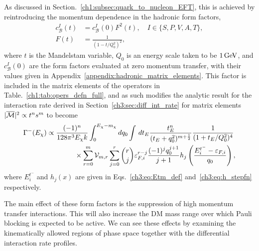 As discussed in Section.~\ref{ch1:subsec:quark_to_nucleon_EFT}, this is achieved by reintroducing the momentum dependence in the hadronic form factors, 
\begin{align}
   c_\mathcal{B}^I(t)  &= c_\mathcal{B}^{I}(0) F^2(t),\quad I\in\{S, P, V, A, T\},\\
   F(t) & = \frac{1}{(1 - t/Q_0^2)^2},\label{ch5:eq:FF_def}
\end{align}
where $t$ is the Mandelstam variable, $Q_0$ is an energy scale taken to be $1{\rm \,GeV}$, and $c_\mathcal{B}^I(0)$ are the form factors evaluated at zero momentum transfer, with their values given in Appendix~\ref{appendix:hadronic_matrix_elements}. This factor is included in the matrix elements of the operators in Table.~\ref{ch1:tab:opers_defn_full}, and as such modifies the analytic result for the interaction rate derived in Section~\ref{ch3:sec:diff_int_rate} for matrix elements $|\overline{\mathcal M}|^2 \propto t^n s^m$ to become
\begin{equation}
   \begin{split}
       \Gamma^{-}(E_\chi) & \propto \frac{(-1)^n }{128\pi^3 E_\chi k }\int_0^{E_\chi -m_\chi} dq_0\int \, dt_E \frac{ t_E^n}{(t_E + q_0^2)^{m+\frac{1}{2}}}\frac{1}{(1 + t_E/Q_0^2)^4}\\
       &\hspace{4em}\times\sum_{r=0}^m \mathcal{V}_{m,r}\sum_{j = 0}^r\binom{r}{j} \varepsilon_{F,i}^{r-j}  \frac{(-1)^{j} q_0^{j+1}}{j+1} h_j\left( \frac{E_i^{t^-} - \varepsilon_{F,i}}{q_0}\right),
   \end{split}
   \label{ch5:eq:gammaFFfinaltext}
\end{equation}
where $E_i^{t^-}$ and $h_j(x)$ are given in Eqs.~\ref{ch3:eq:Etm_def} and~\ref{ch3:eq:h_stepfn} respectively.

The main effect of these form factors is the suppression of high momentum transfer interactions. This will also increase the DM mass range over which Pauli blocking is expected to be active. We can see these effects by examining the kinematically allowed regions of phase space together with the differential interaction rate profiles.


